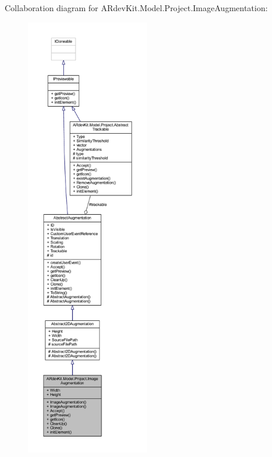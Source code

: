 Collaboration diagram for A\-Rdev\-Kit.\-Model.\-Project.\-Image\-Augmentation\-:
\nopagebreak
\begin{figure}[H]
\begin{center}
\leavevmode
\includegraphics[height=550pt]{class_a_rdev_kit_1_1_model_1_1_project_1_1_image_augmentation__coll__graph}
\end{center}
\end{figure}
